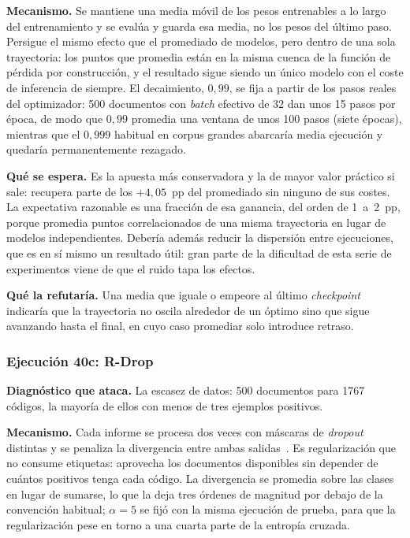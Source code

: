 \textbf{Mecanismo.} Se mantiene una media móvil de los pesos entrenables a lo largo del entrenamiento y se evalúa y guarda esa media, no los pesos del último paso. Persigue el mismo efecto que el promediado de modelos, pero dentro de una sola trayectoria: los puntos que promedia están en la misma cuenca de la función de pérdida por construcción, y el resultado sigue siendo un único modelo con el coste de inferencia de siempre. El decaimiento, $0{,}99$, se fija a partir de los pasos reales del optimizador: 500 documentos con \emph{batch} efectivo de 32 dan unos 15 pasos por época, de modo que $0{,}99$ promedia una ventana de unos 100 pasos (siete épocas), mientras que el $0{,}999$ habitual en corpus grandes abarcaría media ejecución y quedaría permanentemente rezagado.

\textbf{Qué se espera.} Es la apuesta más conservadora y la de mayor valor práctico si sale: recupera parte de los $+4{,}05$~pp del promediado sin ninguno de sus costes. La expectativa razonable es una fracción de esa ganancia, del orden de 1~a~2~pp, porque promedia puntos correlacionados de una misma trayectoria en lugar de modelos independientes. Debería además reducir la dispersión entre ejecuciones, que es en sí mismo un resultado útil: gran parte de la dificultad de esta serie de experimentos viene de que el ruido tapa los efectos.

\textbf{Qué la refutaría.} Una media que iguale o empeore al último \emph{checkpoint} indicaría que la trayectoria no oscila alrededor de un óptimo sino que sigue avanzando hasta el final, en cuyo caso promediar solo introduce retraso.

\subsubsection*{Ejecución 40c: R-Drop}

\textbf{Diagnóstico que ataca.} La escasez de datos: 500 documentos para 1767 códigos, la mayoría de ellos con menos de tres ejemplos positivos.

\textbf{Mecanismo.} Cada informe se procesa dos veces con máscaras de \emph{dropout} distintas y se penaliza la divergencia entre ambas salidas~\cite{wu2021rdrop}. Es regularización que no consume etiquetas: aprovecha los documentos disponibles sin depender de cuántos positivos tenga cada código. La divergencia se promedia sobre las clases en lugar de sumarse, lo que la deja tres órdenes de magnitud por debajo de la convención habitual; $\alpha=5$ se fijó con la misma ejecución de prueba, para que la regularización pese en torno a una cuarta parte de la entropía cruzada.

